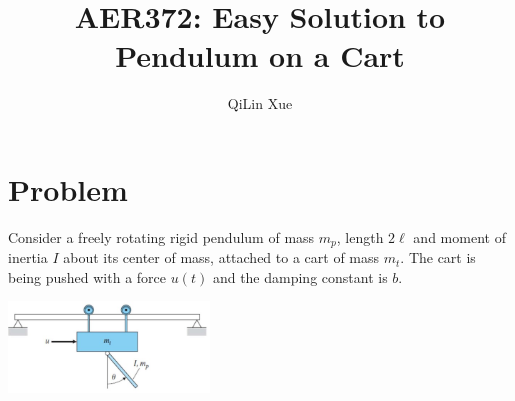 \documentclass{article}
\title{\vspace{-15mm}AER372: Easy Solution to Pendulum on a Cart \vspace{-6mm}}
\author{QiLin Xue}
\date{}
\begin{document}
\maketitle
\vspace{-4mm}
\section*{Problem}
\vspace{-2mm}
Consider a freely rotating rigid pendulum of mass $m_p$, length $2\ell$ and moment of inertia $I$ about its center of mass, attached to a cart of mass $m_t.$ The cart is being pushed with a force $u(t)$ and the damping constant is $b.$
\begin{center}
    \includegraphics[width=0.4\textwidth]{w3_tut1.jpg}
\end{center}
\end{document}
